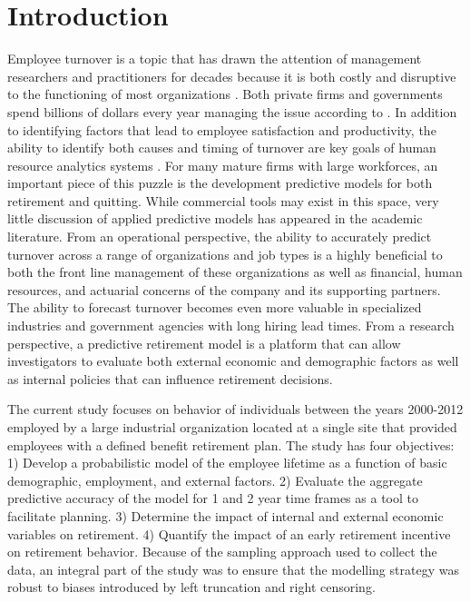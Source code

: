 \documentclass[12pt,letterpaper]{article}
\begin{document}
\section{Introduction}
Employee turnover is a topic that has drawn the attention of management researchers and practitioners for decades because it is both costly and disruptive to the functioning of most organizations \citep{staw1980, mueller1989, kacmar2006}.  Both private firms and governments spend billions of dollars every year managing the issue according to \citet{leonard2001}. In addition to identifying factors that lead to employee satisfaction and  productivity, the ability to identify both causes and timing of turnover are key goals of human resource analytics systems \citep{IBM}. For many mature firms with large workforces, an important piece of this puzzle is the development predictive models for both retirement and quitting.  While commercial tools may exist in this space, very little discussion of applied predictive models has appeared in the academic literature.  From an operational perspective, the ability to accurately predict turnover across a range of organizations and job types is a highly beneficial to both the front line management of these organizations as well as financial, human resources, and actuarial concerns of the company and its supporting partners. The ability to forecast turnover becomes even more valuable in specialized industries and government agencies with long hiring lead times. From a research perspective, a predictive retirement model is a platform that can allow investigators to evaluate both external economic and demographic factors as well as internal policies that can influence retirement decisions.

The current study focuses on behavior of individuals between the years 2000-2012 employed by a large industrial organization located at a single site that provided employees with a defined benefit retirement plan.  The study has four objectives: 1) Develop a probabilistic model of the employee lifetime as a function of basic demographic, employment, and external factors.  2) Evaluate the aggregate predictive accuracy of the model for 1 and 2 year time frames as a tool to facilitate planning. 3) Determine the impact of internal and external economic variables on retirement. 4) Quantify the impact of an early retirement incentive on retirement behavior.  Because of the sampling approach used to collect the data, an integral part of the study was to ensure that the modelling strategy was robust to biases introduced by left truncation and right censoring.
\end{document}
